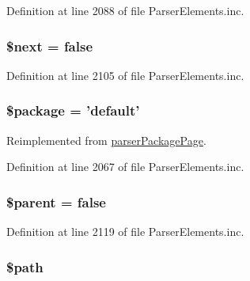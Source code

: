 \-Definition at line 2088 of file \-Parser\-Elements.\-inc.

\hypertarget{classparser_tutorial_ac24f6189c7888ec50c77f7e65a837a62}{
\subsubsection[{\$next}]{\setlength{\rightskip}{0pt plus 5cm}\$next = false}}\label{classparser_tutorial_ac24f6189c7888ec50c77f7e65a837a62}


\-Definition at line 2105 of file \-Parser\-Elements.\-inc.

\hypertarget{classparser_tutorial_a365395516cc195292e97e09bc0d165ae}{
\subsubsection[{\$package}]{\setlength{\rightskip}{0pt plus 5cm}\$package = 'default'}}\label{classparser_tutorial_a365395516cc195292e97e09bc0d165ae}


\-Reimplemented from \hyperlink{classparser_package_page_a365395516cc195292e97e09bc0d165ae}{parser\-Package\-Page}.



\-Definition at line 2067 of file \-Parser\-Elements.\-inc.

\hypertarget{classparser_tutorial_a4e2313a4b35b72a06ac45fd38960f677}{
\subsubsection[{\$parent}]{\setlength{\rightskip}{0pt plus 5cm}\$parent = false}}\label{classparser_tutorial_a4e2313a4b35b72a06ac45fd38960f677}


\-Definition at line 2119 of file \-Parser\-Elements.\-inc.

\hypertarget{classparser_tutorial_a0a4baf0b22973c07685c3981f0d17fc4}{
\subsubsection[{\$path}]{\setlength{\rightskip}{0pt plus 5cm}\$path}}\label{classparser_tutorial_a0a4baf0b22973c07685c3981f0d17fc4}


